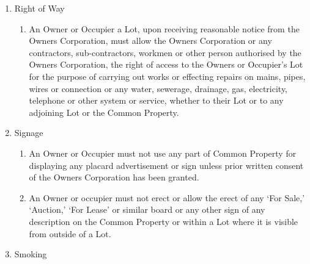 \documentclass{article}
\begin{document}
\begin{enumerate}[label=\arabic*.]
\begin{enumerate}[label=\arabic{enumi}.\arabic*.]
\begin{enumerate}[label=(\arabic*)]
\begin{enumerate}[label=(\arabic*)]
\item  If damage is caused to any Common Property when moving anything over Common Property or through the Development, the Owner or Occupier who is responsible for the move is liable for all damage, liability or loss arising from the moving of goods or equipment by the Lot Owner or Lot Owner’s Occupier, including (without limitation) for any repairs or cleaning that is undertaken by the Owners Corporation as a result thereof and must pay on demand the costs to the Owners Corporation.
\newpage



\end{enumerate}

\item  Right of Way

\begin{enumerate}[label=(\arabic*)]

\item  An Owner or Occupier a Lot, upon receiving reasonable notice from the Owners Corporation, must allow the Owners Corporation or any contractors, sub-contractors, workmen or other person authorised by the Owners Corporation, the right of access to the Owners or Occupier’s Lot for the purpose of carrying out works or effecting repairs on mains, pipes, wires or connection or any water, sewerage, drainage, gas, electricity, telephone or other system or service, whether to their Lot or to any adjoining Lot or the Common Property.

\end{enumerate}

\item  Signage

\begin{enumerate}[label=(\arabic*)]

\item  An Owner or Occupier must not use any part of Common Property for displaying any placard advertisement or sign unless prior written consent of the Owners Corporation has been granted.

\item  An Owner or occupier must not erect or allow the erect of any ‘For Sale,’ ‘Auction,’ ‘For Lease’ or similar board or any other sign of any description on the Common Property or within a Lot where it is visible from outside of a Lot.

\end{enumerate}

\item  Smoking


\end{enumerate}
\end{enumerate}
\end{enumerate}
\end{document}

